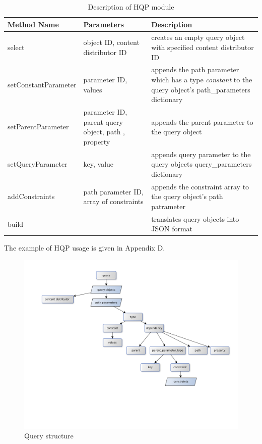 \begin{center}
	\begin{table}
		\label{table:hqp_parameters}
	  	\caption{Description of HQP module}
		\begin{tabular}{|l|p{1in}|p{3in}|}
	    \hline
	    Method Name & Parameters & Description  \\ \hline
	    select & object ID, content distributor ID & creates an empty query object with specified content distributor ID  \\ \hline
	    setConstantParameter & parameter ID, values & appends the path parameter which has a type \textit{constant} to the query object's path\_parameters dictionary  \\ \hline
	    setParentParameter & parameter ID, parent query object, path , property & appends the parent parameter to the query object  \\ \hline
	    setQueryParameter & key, value & appends query parameter to the query objects query\_parameters dictionary \\ \hline
	    addConstraints & path parameter ID, array of constraints& appends the constraint array to the query object's path patrameter \\ \hline
	    build & &  translates query objects into JSON format  \\ \hline
	    \hline
	  	\end{tabular}
  	\end{table}
\end{center}

The example of HQP usage is given in Appendix D.


\begin{figure}[h]
    \centering
	\includegraphics[width=\textwidth]{images/query_structure.png}
    \caption{Query structure}
    \label{fig:query_structure}
\end{figure}


